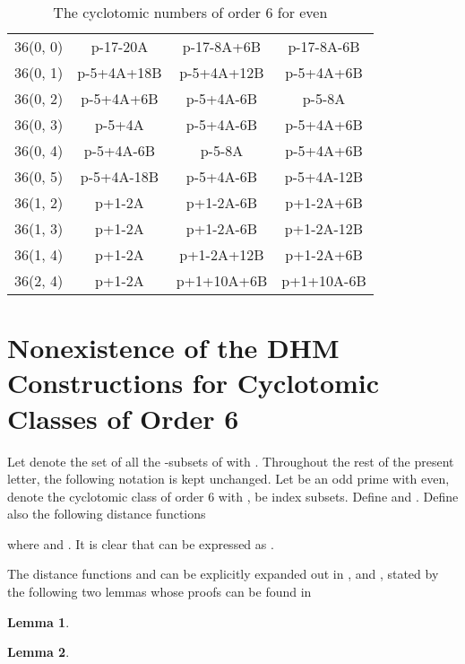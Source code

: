 \documentclass[letter]{ieice}
\newtheorem{sec3_lemma1}{Lemma} \newtheorem{sec3_lemma2}[sec3_lemma1]{Lemma}
\begin{document}
\begin{table}[tb]
\caption{The cyclotomic numbers of order 6 for  even}
\label{lab-table-formulae-for-cn-order6}
{\renewcommand{\tabcolsep}{0.15cm}
\begin{center}
\begin{tabular}{|c|c|c|c|}
\hline
&     &    & \\
\hline
36(0, 0)&	p-17-20A	&	p-17-8A+6B	    &	p-17-8A-6B\\
\hline
36(0, 1)&	p-5+4A+18B	&	p-5+4A+12B	    &	p-5+4A+6B\\
\hline
36(0, 2)&	p-5+4A+6B	&	p-5+4A-6B	    &	p-5-8A\\
\hline
36(0, 3)&	p-5+4A  	&	p-5+4A-6B 	    &	p-5+4A+6B\\
\hline
36(0, 4)&	p-5+4A-6B	&	p-5-8A   	    &	p-5+4A+6B\\
\hline
36(0, 5)&	p-5+4A-18B	&	p-5+4A-6B	    &	p-5+4A-12B\\
\hline
36(1, 2)&	p+1-2A  	&	p+1-2A-6B	    &	p+1-2A+6B\\
\hline
36(1, 3)&	p+1-2A  	&	p+1-2A-6B	    &	p+1-2A-12B\\
\hline
36(1, 4)&	p+1-2A  	&	p+1-2A+12B	    &	p+1-2A+6B\\
\hline
36(2, 4)&	p+1-2A  	&	p+1+10A+6B	    &	p+1+10A-6B\\
\hline
\end{tabular}
\end{center}
}
\end{table}
\section{Nonexistence of the DHM Constructions for Cyclotomic Classes of Order 6}\label{sec 3}
Let  denote the set of all the -subsets of  with . 
Throughout the rest of the present letter, the following notation is kept unchanged. Let  be  an odd prime with  even,  denote the  cyclotomic class of order 6 with ,  be index subsets. Define  and . Define also the following distance functions
 
 where  and . It is clear that   can be expressed as \cite{ar01,ar02}. 

 The distance functions  and  can be explicitly expanded out in ,  and , stated by the following two lemmas whose proofs can be found in \cite[eq.(2) and eq.(4)]{ar03}
  \begin{sec3_lemma1}\label{lab-sec3-lamma1}
   
   \end{sec3_lemma1}
 \begin{sec3_lemma2}\label{lab-sec3-lamma2}
  
  \end{sec3_lemma2}
  
\end{document}
